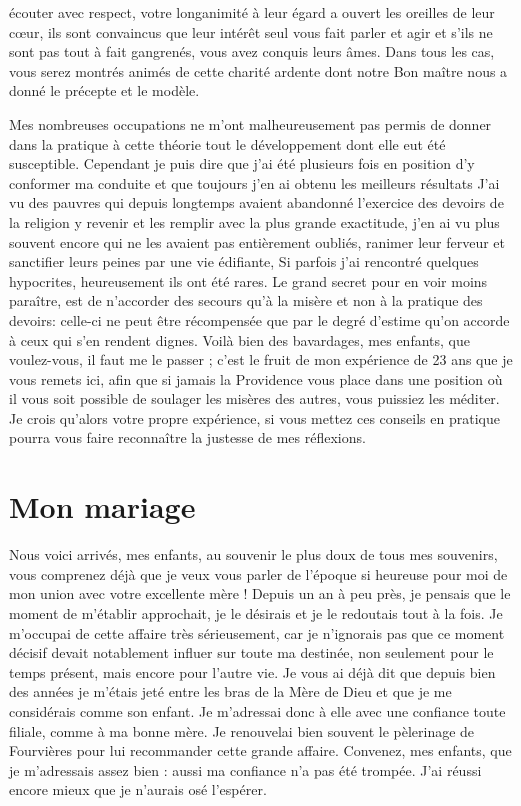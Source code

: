 \documentclass[11pt,a4paper]{report}
\begin{document}
écouter avec respect, votre longanimité à leur égard a ouvert les oreilles de leur cœur, ils sont convaincus que leur intérêt seul vous fait parler et agir et s'ils ne sont pas tout à fait gangrenés, vous avez conquis leurs âmes. Dans tous les cas, vous serez montrés animés de cette charité ardente dont notre Bon maître nous a donné le précepte et le modèle.

Mes nombreuses occupations ne m'ont malheureusement pas permis de donner dans la pratique à cette théorie tout le développement dont elle eut été susceptible. Cependant je puis dire que j'ai été plusieurs fois en position d'y conformer ma conduite et que toujours j'en ai obtenu les meilleurs résultats J'ai vu des pauvres qui depuis longtemps avaient abandonné l'exercice des devoirs de la religion y revenir et les remplir avec la plus grande exactitude, j'en ai vu plus souvent encore qui ne les avaient pas entièrement oubliés, ranimer leur ferveur et sanctifier leurs peines par une vie édifiante, Si parfois j'ai rencontré quelques hypocrites, heureusement ils ont été rares. Le grand secret pour en voir moins paraître, est de n'accorder des secours qu'à la misère et non à la pratique des devoirs: celle-ci ne peut être récompensée que par le degré d'estime qu'on accorde à ceux qui s'en rendent dignes. Voilà bien des bavardages, mes enfants, que voulez-vous, il faut me le passer ; c'est le fruit de mon expérience de 23 ans que je vous remets ici, afin que si jamais la Providence vous place dans une position où il vous soit possible de soulager les misères des autres, vous puissiez les méditer. Je crois qu'alors votre propre expérience, si vous mettez ces conseils en pratique pourra vous faire reconnaître la justesse de mes réflexions.

\section*{Mon mariage}

Nous voici arrivés, mes enfants, au souvenir le plus doux de tous mes souvenirs, vous comprenez déjà que je veux vous parler de l'époque si heureuse pour moi de mon union avec votre excellente mère ! Depuis un an à peu près, je pensais que le moment de m'établir approchait, je le désirais et je le redoutais tout à la fois. Je m'occupai de cette affaire très sérieusement, car je n'ignorais pas que ce moment décisif devait notablement influer sur toute ma destinée, non seulement pour le temps présent, mais encore pour l'autre vie. Je vous ai déjà dit que depuis bien des années je m'étais jeté entre les bras de la Mère de Dieu et que je me considérais comme son enfant. Je m'adressai donc à elle avec une confiance toute filiale, comme à ma bonne mère. Je renouvelai bien souvent le pèlerinage de Fourvières pour lui recommander cette grande affaire. Convenez, mes enfants, que je m'adressais assez bien : aussi ma confiance n'a pas été trompée. J'ai réussi encore mieux que je n'aurais osé l'espérer.
\end{document}
